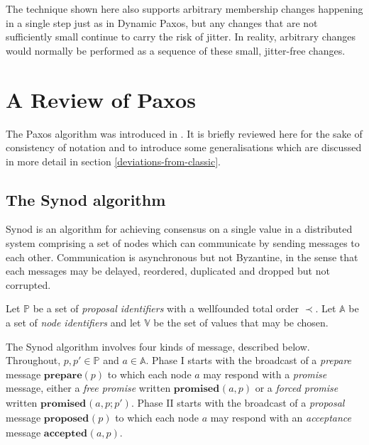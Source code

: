 \documentclass[journal]{IEEEtran}
\begin{document}
The technique shown here also supports arbitrary membership changes happening
in a single step just as in Dynamic Paxos, but any changes that are not
sufficiently small continue to carry the risk of jitter. In reality, arbitrary
changes would normally be performed as a sequence of these small, jitter-free
changes.

\section{A Review of Paxos}

The Paxos algorithm was introduced in \cite{part-time-parliament}. It is
briefly reviewed here for the sake of consistency of notation and to introduce
some generalisations which are discussed in more detail in section
\ref{deviations-from-classic}.

\subsection{The Synod algorithm}

Synod is an algorithm for achieving consensus on a single value in a
distributed system comprising a set of nodes which can communicate by sending
messages to each other. Communication is asynchronous but not Byzantine, in the
sense that each messages may be delayed, reordered, duplicated and dropped but
not corrupted.

Let $\mathbb P$ be a set of \textit{proposal identifiers} with a wellfounded
total order $\prec$. Let $\mathbb A$ be a set of \textit{node identifiers} and
let $\mathbb V$ be the set of values that may be chosen.

\def\prep#1{\mathbf{prepare}(#1)}
\def\mprom#1#2#3{\mathbf{promised}_{\ge #1}(#2,#3)}
\def\fprom#1#2#3{\mathbf{promised}_{#1}(#2,#3)}
\def\bprom#1#2#3#4{\mathbf{promised}_{#1}(#2,#3;#4)}
\def\prop#1#2{\mathbf{proposed}_{#1}(#2)}
\def\acc#1#2#3{\mathbf{accepted}_{#1}(#2,#3)}
\def\chosen#1#2{\mathbf{chosen}_{#1}(#2)}
\def\owner#1{\mathrm{owner}(#1)}

The Synod algorithm involves four kinds of message, described below.
Throughout, $p, p' \in \mathbb P$ and $a \in \mathbb A$.  Phase I starts with
the broadcast of a \textit{prepare} message $\prep{p}$ to which each node $a$
may respond with a \textit{promise} message, either a \textit{free promise}
written $\fprom{}{a}{p}$ or a \textit{forced promise} written
$\bprom{}{a}{p}{p'}$.  Phase II starts with the broadcast of a
\textit{proposal} message $\prop{}{p}$ to which each node $a$ may respond with
an \textit{acceptance} message $\acc{}{a}{p}$.
\end{document}
